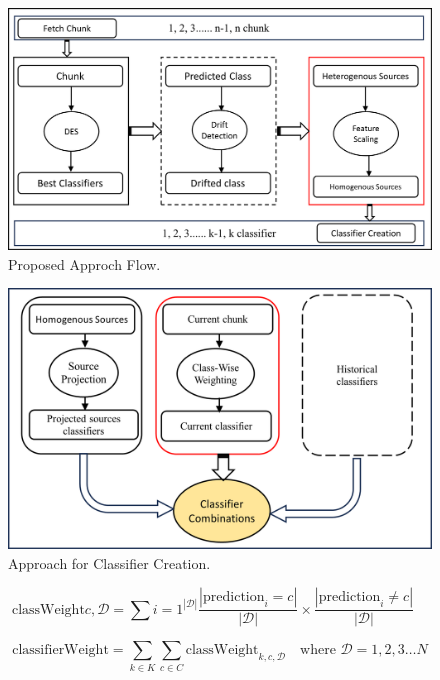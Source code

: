 \begin{figure}[!ht]
	\centering
	\includegraphics[width=1\linewidth]{6_transfer_learning/figures/alg1.png}
	\caption{Proposed Approch Flow.}
	\label{fig:6_alg1}
\end{figure}
\begin{figure}[!ht]
	\centering
	\includegraphics[width=1\linewidth]{6_transfer_learning/figures/alg2.png}
	\caption{Approach for Classifier Creation.}
	\label{fig:6_alg2}
\end{figure}

\begin{equation}
	\label{eq:6_eq_1}
	\text{classWeight}{c,\mathcal{D}} = \sum{i=1}^{|\mathcal{D}|} \frac{|\text{prediction}_i = c|}{|\mathcal{D}|} \times \frac{|\text{prediction}_i \neq c|}{|\mathcal{D}|} \quad
\end{equation}

\begin{equation}
	\label{eq:6_eq_2}
	\text{classifierWeight} = \sum_{k \in K} \sum_{c \in C} \text{classWeight}_{k,c,\mathcal{D}} \quad \text{where } \mathcal{D} = 1,2,3 \dots N
\end{equation}

